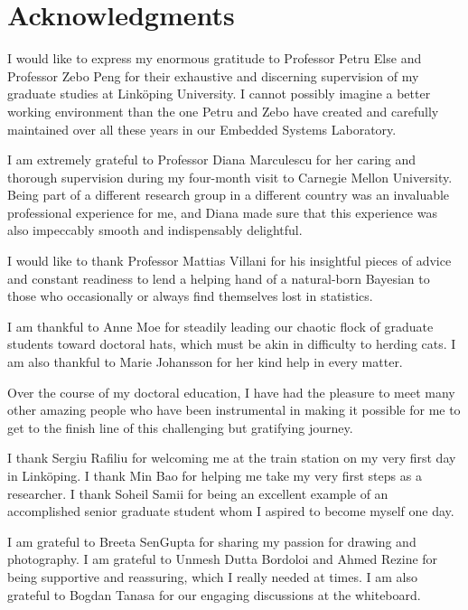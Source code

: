 \chapter*{Acknowledgments}
\newcommand\person[2]{#2 #1}

I would like to express my enormous gratitude to Professor \person{Else}{Petru}
and Professor \person{Peng}{Zebo} for their exhaustive and discerning
supervision of my graduate studies at Linköping University. I cannot possibly
imagine a better working environment than the one Petru and Zebo have created
and carefully maintained over all these years in our Embedded Systems
Laboratory.

I am extremely grateful to Professor \person{Marculescu}{Diana} for her caring
and thorough supervision during my four-month visit to Carnegie Mellon
University. Being part of a different research group in a different country was
an invaluable professional experience for me, and Diana made sure that this
experience was also impeccably smooth and indispensably delightful.

I would like to thank Professor \person{Villani}{Mattias} for his insightful
pieces of advice and constant readiness to lend a helping hand of a natural-born
Bayesian to those who occasionally or always find themselves lost in statistics.

I am thankful to \person{Moe}{Anne} for steadily leading our chaotic flock of
graduate students toward doctoral hats, which must be akin in difficulty to
herding cats. I am also thankful to \person{Johansson}{Marie} for her kind help
in every matter.

Over the course of my doctoral education, I have had the pleasure to meet many
other amazing people who have been instrumental in making it possible for me to
get to the finish line of this challenging but gratifying journey.

I thank \person{Rafiliu}{Sergiu} for welcoming me at the train station on my
very first day in Linköping. I thank \person{Bao}{Min} for helping me take my
very first steps as a researcher. I thank \person{Samii}{Soheil} for being an
excellent example of an accomplished senior graduate student whom I aspired to
become myself one day.

I am grateful to \person{SenGupta}{Breeta} for sharing my passion for drawing
and photography. I am grateful to \person{Dutta Bordoloi}{Unmesh} and
\person{Rezine}{Ahmed} for being supportive and reassuring, which I really
needed at times. I am also grateful to \person{Tanasa}{Bogdan} for our engaging
discussions at the whiteboard.

